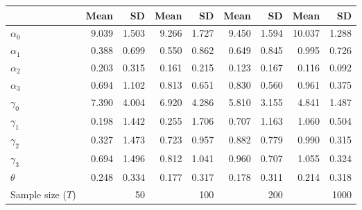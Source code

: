 
\begin{tabular}[t]{lrrrrrrrr}
\toprule
  & Mean & SD & Mean  & SD  & Mean   & SD   & Mean    & SD   \\
\midrule
$\alpha_{0}$ & 9.039 & 1.503 & 9.266 & 1.727 & 9.450 & 1.594 & 10.037 & 1.288\\
$\alpha_{1}$ & 0.388 & 0.699 & 0.550 & 0.862 & 0.649 & 0.845 & 0.995 & 0.726\\
$\alpha_{2}$ & 0.203 & 0.315 & 0.161 & 0.215 & 0.123 & 0.167 & 0.116 & 0.092\\
$\alpha_{3}$ & 0.694 & 1.102 & 0.813 & 0.651 & 0.830 & 0.560 & 0.961 & 0.375\\
$\gamma_{0}$ & 7.390 & 4.004 & 6.920 & 4.286 & 5.810 & 3.155 & 4.841 & 1.487\\
$\gamma_{1}$ & 0.198 & 1.442 & 0.255 & 1.706 & 0.707 & 1.163 & 1.060 & 0.504\\
$\gamma_{2}$ & 0.327 & 1.473 & 0.723 & 0.957 & 0.882 & 0.779 & 0.990 & 0.315\\
$\gamma_{3}$ & 0.694 & 1.496 & 0.812 & 1.041 & 0.960 & 0.707 & 1.055 & 0.324\\
$\theta$ & 0.248 & 0.334 & 0.177 & 0.317 & 0.178 & 0.311 & 0.214 & 0.318\\
Sample size ($T$) &  & 50 &  & 100 &  & 200 &  & 1000\\
\bottomrule
\end{tabular}
